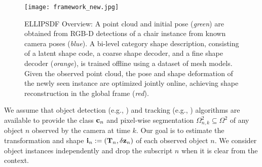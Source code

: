 \begin{figure*}[t] 
  \centering
  \texttt{[image: framework\_new.jpg]}
  \caption{ELLIPSDF Overview: A point cloud and initial pose (\textit{green}) are obtained from RGB-D detections of a chair instance from known camera poses (\textit{blue}). A bi-level category shape description, consisting of a latent shape code, a coarse shape decoder, and a fine shape decoder (\textit{orange}), is trained offline using a dataset of mesh models. Given the observed point cloud, the pose and shape deformation of the newly seen instance are optimized jointly online, achieving shape reconstruction in the global frame (\textit{red}).}
  \label{fig:framework}
\end{figure*}


We assume that object detection (e.g., \cite{Cai2019Cascade}) and tracking (e.g., \cite{bewley2016simple}) algorithms are available to provide the class $\mathbf{c}_n$ and pixel-wise segmentation $\Omega_{n,k}^2 \subseteq \Omega^2$ of any object $n$ observed by the camera at time $k$. %
Our goal is to estimate the transformation and shape $\mathbf{i}_n := (\mathbf{T}_n, \delta \mathbf{z}_n)$ of each observed object $n$. We consider object instances independently and drop the subscript $n$ when it is clear from the context. 


